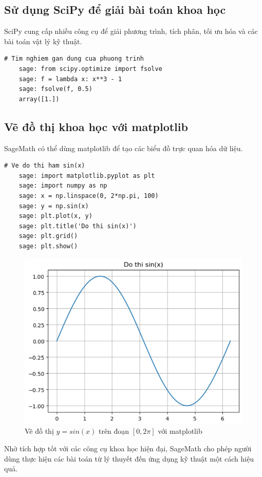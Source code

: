 \subsection{Sử dụng SciPy để giải bài toán khoa học}

SciPy cung cấp nhiều công cụ để giải phương trình, tích phân, tối ưu hóa và các bài toán vật lý kỹ thuật.

\begin{lstlisting}[basicstyle=\ttfamily\small]
	# Tim nghiem gan dung cua phuong trinh
	sage: from scipy.optimize import fsolve
	sage: f = lambda x: x**3 - 1
	sage: fsolve(f, 0.5)
	array([1.])
\end{lstlisting}

\subsection{Vẽ đồ thị khoa học với matplotlib}

SageMath có thể dùng matplotlib để tạo các biểu đồ trực quan hóa dữ liệu.

\begin{lstlisting}[basicstyle=\ttfamily\small]
	# Ve do thi ham sin(x)
	sage: import matplotlib.pyplot as plt
	sage: import numpy as np
	sage: x = np.linspace(0, 2*np.pi, 100)
	sage: y = np.sin(x)
	sage: plt.plot(x, y)
	sage: plt.title('Do thi sin(x)')
	sage: plt.grid()
	sage: plt.show()
\end{lstlisting}
\begin{figure}[H]
	\centering
	\includegraphics[width=0.7\linewidth]{images/4232}
	\caption{Vẽ đồ thị $y=sin(x)$ trên đoạn $\left[0,2\pi\right]$ với matplotlib}
	\label{fig:4232}
\end{figure}


Nhờ tích hợp tốt với các công cụ khoa học hiện đại, SageMath cho phép người dùng thực hiện các bài toán từ lý thuyết đến ứng dụng kỹ thuật một cách hiệu quả.

